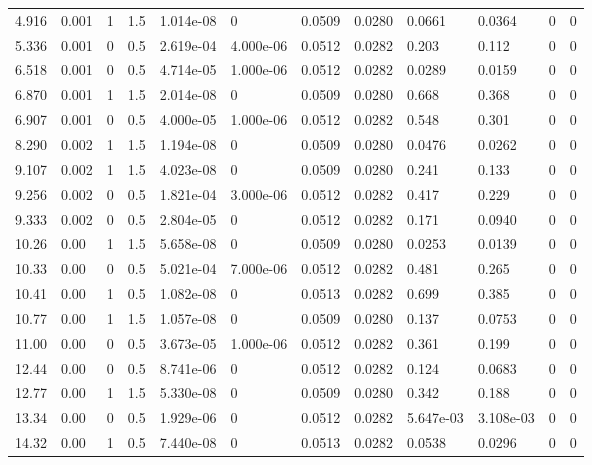 \documentclass[preview]{standalone}
\begin{document}
{{\begin{tabular}{L{1.2cm}C{1.2cm} C{0.3cm}C{0.5cm} C{1.4cm}C{1.4cm} C{1.4cm}C{1.4cm} C{1.6cm}C{1.6cm} C{1.6cm}C{1.6cm}}
  4.916  &  0.001  & 1     & 1.5 &  1.014e-08  & 0  &  0.0509&   0.0280& 0.0661 & 0.0364   &  0 & 0  \\ 
  5.336  &  0.001  & 0     & 0.5 &  2.619e-04  & 4.000e-06  &  0.0512&   0.0282& 0.203 & 0.112   &  0 & 0  \\ 
  6.518  &  0.001  & 0     & 0.5 &  4.714e-05  & 1.000e-06  &  0.0512&   0.0282& 0.0289 & 0.0159   &  0 & 0  \\ 
  6.870  &  0.001  & 1     & 1.5 &  2.014e-08  & 0  &  0.0509&   0.0280& 0.668 & 0.368   &  0 & 0  \\ 
  6.907  &  0.001  & 0     & 0.5 &  4.000e-05  & 1.000e-06  &  0.0512&   0.0282& 0.548 & 0.301   &  0 & 0  \\ 
  8.290  &  0.002  & 1     & 1.5 &  1.194e-08  & 0  &  0.0509&   0.0280& 0.0476 & 0.0262   &  0 & 0  \\ 
  9.107  &  0.002  & 1     & 1.5 &  4.023e-08  & 0  &  0.0509&   0.0280& 0.241 & 0.133   &  0 & 0  \\ 
  9.256  &  0.002  & 0     & 0.5 &  1.821e-04  & 3.000e-06  &  0.0512&   0.0282& 0.417 & 0.229   &  0 & 0  \\ 
  9.333  &  0.002  & 0     & 0.5 &  2.804e-05  & 0  &  0.0512&   0.0282& 0.171 & 0.0940   &  0 & 0  \\ 
  10.26  &  0.00  & 1     & 1.5 &  5.658e-08  & 0  &  0.0509&   0.0280& 0.0253 & 0.0139   &  0 & 0  \\ 
  10.33  &  0.00  & 0     & 0.5 &  5.021e-04  & 7.000e-06  &  0.0512&   0.0282& 0.481 & 0.265   &  0 & 0  \\ 
  10.41  &  0.00  & 1     & 0.5 &  1.082e-08  & 0  &  0.0513&   0.0282& 0.699 & 0.385   &  0 & 0  \\ 
  10.77  &  0.00  & 1     & 1.5 &  1.057e-08  & 0  &  0.0509&   0.0280& 0.137 & 0.0753   &  0 & 0  \\ 
  11.00  &  0.00  & 0     & 0.5 &  3.673e-05  & 1.000e-06  &  0.0512&   0.0282& 0.361 & 0.199   &  0 & 0  \\ 
  12.44  &  0.00  & 0     & 0.5 &  8.741e-06  & 0  &  0.0512&   0.0282& 0.124 & 0.0683   &  0 & 0  \\ 
  12.77  &  0.00  & 1     & 1.5 &  5.330e-08  & 0  &  0.0509&   0.0280& 0.342 & 0.188   &  0 & 0  \\ 
  13.34  &  0.00  & 0     & 0.5 &  1.929e-06  & 0  &  0.0512&   0.0282& 5.647e-03 & 3.108e-03   &  0 & 0  \\ 
  14.32  &  0.00  & 1     & 0.5 &  7.440e-08  & 0  &  0.0513&   0.0282& 0.0538 & 0.0296   &  0 & 0  \\ 

\end{tabular}}}
\end{document}
